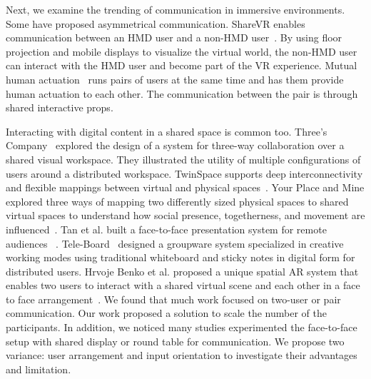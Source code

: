 \documentclass{sigchi}
\begin{document}
Next, we examine the trending of communication in immersive environments. Some have proposed asymmetrical communication. ShareVR enables communication between an HMD user and a non-HMD user~\cite{gugenheimer2017sharevr}. By using floor projection and mobile displays to visualize the virtual world, the non-HMD user can interact with the HMD user and become part of the VR experience. Mutual human actuation~\cite{cheng2017mutual} runs pairs of users at the same time and has them provide human actuation to each other. The communication between the pair is through shared interactive props.

Interacting with digital content in a shared space is common too. Three's Company~\cite{tang2010three} explored the design of a system for three-way collaboration over a shared visual workspace. They illustrated the utility of multiple configurations of users around a distributed workspace. TwinSpace supports deep interconnectivity and flexible mappings between virtual and physical spaces~\cite{reilly2010twinspace}. Your Place and Mine explored three ways of mapping two differently sized physical spaces to shared virtual spaces to understand how social presence, togetherness, and movement are influenced~\cite{sra2018}. Tan et al. built a face-to-face presentation system for remote audiences ~\cite{gazeAwareness}. Tele-Board~\cite{gumienny2011tele} designed a groupware system specialized in creative working modes using traditional whiteboard and sticky notes in digital form for distributed users. Hrvoje Benko et al. proposed a unique spatial AR system that enables two users to interact with a shared virtual scene and each other in a face to face arrangement~\cite{benko2014dyadic}. We found that much work focused on two-user or pair communication. Our work proposed a solution to scale the number of the participants. In addition, we noticed many studies experimented the face-to-face setup with shared display or round table for communication. We propose two variance: user arrangement and input orientation to investigate their advantages and limitation.
\end{document}
